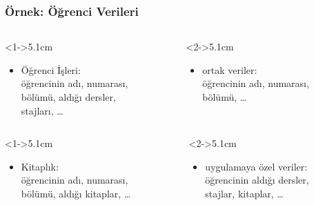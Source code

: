 \documentclass[dvipsnames]{beamer}
\theoremstyle{plain}
\begin{document}
\begin{frame}
  \frametitle{Örnek: Öğrenci Verileri}

 
    \begin{columns}[t]
      \begin{column}<1->{5.1cm}
      \begin{itemize}
        \item Öğrenci İşleri:\\
          öğrencinin adı, numarası,\\
          bölümü, aldığı dersler,\\
          stajları, \ldots
      \end{itemize}
      \end{column}

      \begin{column}<2->{5.1cm}
      \begin{itemize}
        \item ortak veriler:\\
          öğrencinin adı, numarası,\\
          bölümü, \ldots
      \end{itemize}
      \end{column}
    \end{columns}

    \begin{columns}[t]
      \begin{column}<1->{5.1cm}
      \begin{itemize}
        \item Kitaplık:\\
          öğrencinin adı, numarası,\\
          bölümü, aldığı kitaplar, \ldots
      \end{itemize}
      \end{column}

      \begin{column}<2->{5.1cm}
      \begin{itemize}
        \item uygulamaya özel veriler:\\
          öğrencinin aldığı dersler,\\
          stajlar, kitaplar, \ldots
      \end{itemize}
      \end{column}
    \end{columns}
  
\end{frame}
\end{document}

